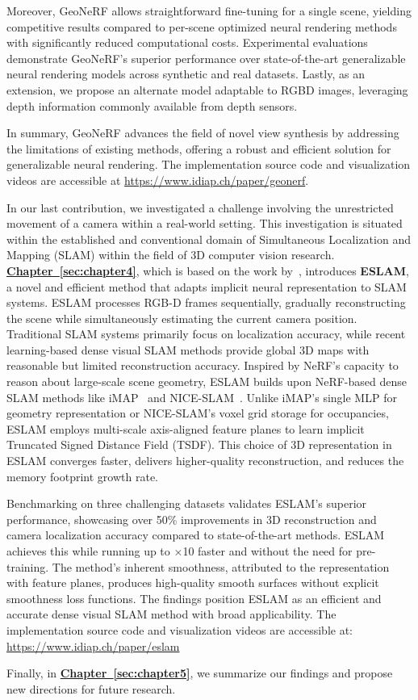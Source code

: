 Moreover, GeoNeRF allows straightforward fine-tuning for a single scene, yielding competitive results compared to per-scene optimized neural rendering methods with significantly reduced computational costs. Experimental evaluations demonstrate GeoNeRF's superior performance over state-of-the-art generalizable neural rendering models across synthetic and real datasets. Lastly, as an extension, we propose an alternate model adaptable to RGBD images, leveraging depth information commonly available from depth sensors.

In summary, GeoNeRF advances the field of novel view synthesis by addressing the limitations of existing methods, offering a robust and efficient solution for generalizable neural rendering. The implementation source code and visualization videos are accessible at \href{https://www.idiap.ch/paper/geonerf}{https://www.idiap.ch/paper/geonerf}.

In our last contribution, we investigated a challenge involving the unrestricted movement of a camera within a real-world setting. This investigation is situated within the established and conventional domain of Simultaneous Localization and Mapping (SLAM) within the field of 3D computer vision research. \textbf{\hyperref[sec:chapter4]{Chapter~\ref{sec:chapter4}}}, which is based on the work by~\cite{johari2023eslam}, introduces \textbf{ESLAM}, a novel and efficient method that adapts implicit neural representation to SLAM systems. ESLAM processes RGB-D frames sequentially, gradually reconstructing the scene while simultaneously estimating the current camera position. Traditional SLAM systems primarily focus on localization accuracy, while recent learning-based dense visual SLAM methods provide global 3D maps with reasonable but limited reconstruction accuracy. Inspired by NeRF's capacity to reason about large-scale scene geometry, ESLAM builds upon NeRF-based dense SLAM methods like iMAP~\citep{sucar2021imap} and NICE-SLAM~\citep{zhu2022nice}. Unlike iMAP's single MLP for geometry representation or NICE-SLAM's voxel grid storage for occupancies, ESLAM employs multi-scale axis-aligned feature planes to learn implicit Truncated Signed Distance Field (TSDF). This choice of 3D representation in ESLAM converges faster, delivers higher-quality reconstruction, and reduces the memory footprint growth rate.

Benchmarking on three challenging datasets validates ESLAM's superior performance, showcasing over 50\% improvements in 3D reconstruction and camera localization accuracy compared to state-of-the-art methods. ESLAM achieves this while running up to $\times$10 faster and without the need for pre-training. The method's inherent smoothness, attributed to the representation with feature planes, produces high-quality smooth surfaces without explicit smoothness loss functions. The findings position ESLAM as an efficient and accurate dense visual SLAM method with broad applicability. The implementation source code and visualization videos are accessible at: \href{https://www.idiap.ch/paper/eslam}{https://www.idiap.ch/paper/eslam}

Finally, in \textbf{\hyperref[sec:chapter5]{Chapter~\ref{sec:chapter5}}}, we summarize our findings and propose new directions for future research.